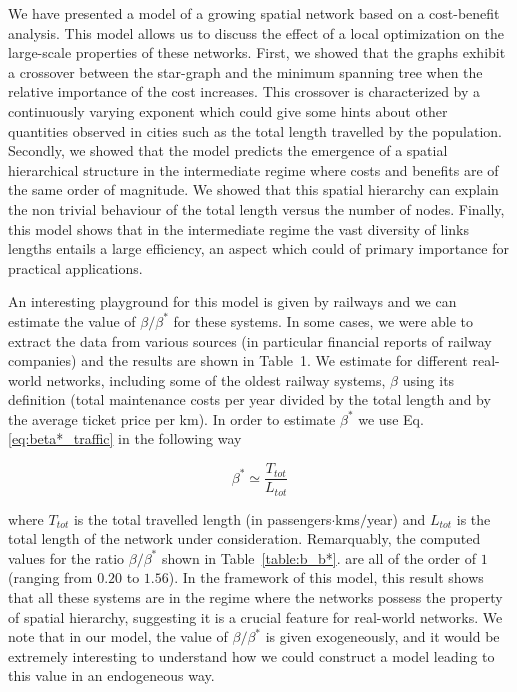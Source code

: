 We have presented a model of a growing spatial network based on a cost-benefit
analysis. This model allows us to discuss the effect of a local optimization on
the large-scale properties of these networks. First, we showed that the graphs
exhibit a crossover between the star-graph and the minimum spanning tree when
the relative importance of the cost increases. This crossover is characterized
by a continuously varying exponent which could give some hints about other
quantities observed in cities such as the total length travelled by the
population. Secondly, we showed that the model predicts the emergence of a
spatial hierarchical structure in the intermediate regime where costs and
benefits are of the same order of magnitude. We showed that this spatial
hierarchy can explain the non trivial behaviour of the total length versus the
number of nodes. Finally, this model shows that in the intermediate regime the
vast diversity of links lengths entails a large efficiency, an aspect which
could of primary importance for practical applications.

An interesting playground for this model is given by railways and we can
estimate the value of $\beta/\beta^*$ for these systems. In some cases, we were
able to extract the data from various sources (in particular financial reports
of railway companies) and the results are shown in Table~1. We estimate for
different real-world networks, including some of the oldest railway systems,
$\beta$ using its definition (total maintenance costs per year divided by the
total length and by the average ticket price per km). In order to estimate
$\beta^*$ we use Eq.\ref{eq:beta*_traffic} in the following way

\begin{equation}
    \beta^*\simeq\frac{T_{tot}}{L_{tot}}
\end{equation}

where $T_{tot}$ is the total travelled length (in passengers$\cdot$kms$/$year)
and $L_{tot}$ is the total length of the network under consideration.
Remarquably, the computed values for the ratio $\beta/\beta^*$ shown in
Table~\ref{table:b_b*}.
are all of the order of $1$ (ranging from $0.20$ to $1.56$). In the framework of
this model, this result shows that all these systems are in the regime where the
networks possess the property of spatial hierarchy, suggesting it is a crucial
feature for real-world networks. We note that in our model, the value of $\beta
/ \beta^*$ is given exogeneously, and it would be extremely interesting to
understand how we could construct a model leading to this value in an
endogeneous way.


